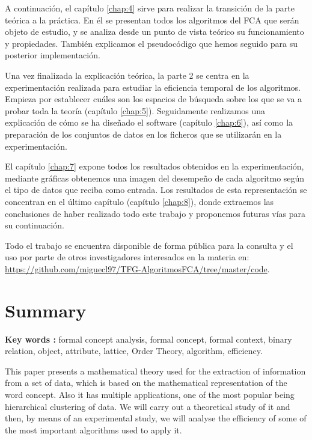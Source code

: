 \documentclass[oneside,openright,titlepage,numbers=noenddot,openany,headinclude,footinclude=true,
cleardoublepage=empty,abstractoff,BCOR=5mm,paper=a4,fontsize=12pt,main=spanish]{scrreprt}
\begin{document}
A continuación, el capítulo \ref{chap:4} sirve para realizar la transición de la parte teórica a la práctica. En él se presentan todos los algoritmos del FCA que serán objeto de estudio, y se analiza desde un punto de vista teórico su funcionamiento y propiedades. También explicamos el pseudocódigo que hemos seguido para su posterior implementación.

Una vez finalizada la explicación teórica, la parte 2 se centra en la experimentación realizada para estudiar la eficiencia temporal de los algoritmos. Empieza por establecer cuáles son los espacios de búsqueda sobre los que se va a probar toda la teoría (capítulo \ref{chap:5}). Seguidamente realizamos una explicación de cómo se ha diseñado el software (capítulo \ref{chap:6}), así como la preparación de los conjuntos de datos en los ficheros que se utilizarán en la experimentación.

El capítulo \ref{chap:7} expone todos los resultados obtenidos en la experimentación, mediante gráficas obtenemos una imagen del desempeño de cada algoritmo según el tipo de datos que reciba como entrada. Los resultados de esta representación se concentran en el último capítulo (capítulo \ref{chap:8}), donde extraemos las conclusiones de haber realizado todo este trabajo y proponemos futuras vías para su continuación.

Todo el trabajo se encuentra disponible de forma pública para la consulta y el uso por parte de otros investigadores interesados en la materia en:\\
\href{https://github.com/miguecl97/TFG-AlgoritmosFCA/tree/master/code}{https://github.com/miguecl97/TFG-AlgoritmosFCA/tree/master/code}.

\chapter*{Summary}
\textbf{Key words :} formal concept analysis, formal concept, formal context, binary relation, object, attribute, lattice, Order Theory, algorithm, efficiency.

This paper presents a mathematical theory used for the extraction of information from a set of data, which is based on the mathematical representation of the word concept. Also it has multiple applications, one of the most popular being hierarchical clustering of data. We will carry out a theoretical study of it and then, by means of an experimental study, we will analyse the efficiency of some of the most important algorithms used to apply it.
\end{document}
